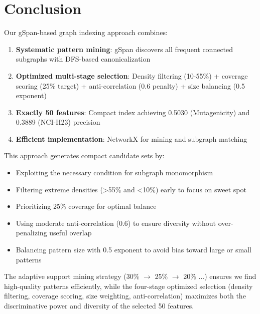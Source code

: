 \documentclass[12pt,a4paper]{article}
\begin{document}
\section{Conclusion}

Our gSpan-based graph indexing approach combines:
\begin{enumerate}
    \item \textbf{Systematic pattern mining}: gSpan discovers all frequent connected subgraphs with DFS-based canonicalization
    \item \textbf{Optimized multi-stage selection}: Density filtering (10-55\%) + coverage scoring (25\% target) + anti-correlation (0.6 penalty) + size balancing (0.5 exponent)
    \item \textbf{Exactly 50 features}: Compact index achieving 0.5030 (Mutagenicity) and 0.3889 (NCI-H23) precision
    \item \textbf{Efficient implementation}: NetworkX for mining and subgraph matching
\end{enumerate}

This approach generates compact candidate sets by:
\begin{itemize}
    \item Exploiting the necessary condition for subgraph monomorphism
    \item Filtering extreme densities (>55\% and <10\%) early to focus on sweet spot
    \item Prioritizing 25\% coverage for optimal balance
    \item Using moderate anti-correlation (0.6) to ensure diversity without over-penalizing useful overlap
    \item Balancing pattern size with 0.5 exponent to avoid bias toward large or small patterns
\end{itemize}

The adaptive support mining strategy (30\% $\rightarrow$ 25\% $\rightarrow$ 20\% ...) ensures we find high-quality patterns efficiently, while the four-stage optimized selection (density filtering, coverage scoring, size weighting, anti-correlation) maximizes both the discriminative power and diversity of the selected 50 features.
\end{document}
